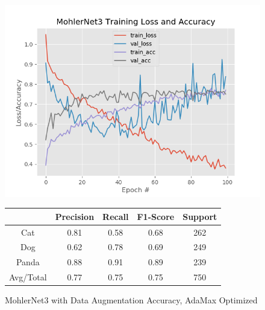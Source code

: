 \documentclass[12pt]{article}
\begin{document}
\begin{center}
	 \\
\end{center}


\begin{figure}[h]
	\centering %
	\captionsetup{justification=centering}
	\begin{minipage}{0.5\textwidth}
		\centering %
		\includegraphics[width=1\textwidth]{MohlerNet3_opt-AdamaxAugmented_KEEP.png}
		\caption{MohlerNet3 with Data Augmentation Accuracy, AdaMax Optimized} \label{MN3Aug}
	\end{minipage}\hfill
	\begin{minipage}{0.5\textwidth}
		\begin{center}
			\begin{tabular}[5pt]{| c| c| c| c|c|}
				\hline
				& Precision & Recall & F1-Score & Support \\[0.5ex] 
				\hline 	
				Cat   &    0.81&      0.58 &     0.68  &     262\\ \hline 
				Dog    &   0.62 &     0.78 &     0.69 &      249    \\ \hline 
				Panda   &   0.88&      0.91  &    0.89  &     239   \\ \hline 
				Avg/Total  &    0.77 &     0.75   &   0.75   &    750\\ \hline 
				
			\end{tabular}
			\label{MN2RAug}
		\end{center}	
	\end{minipage}
\end{figure}
\end{document}
